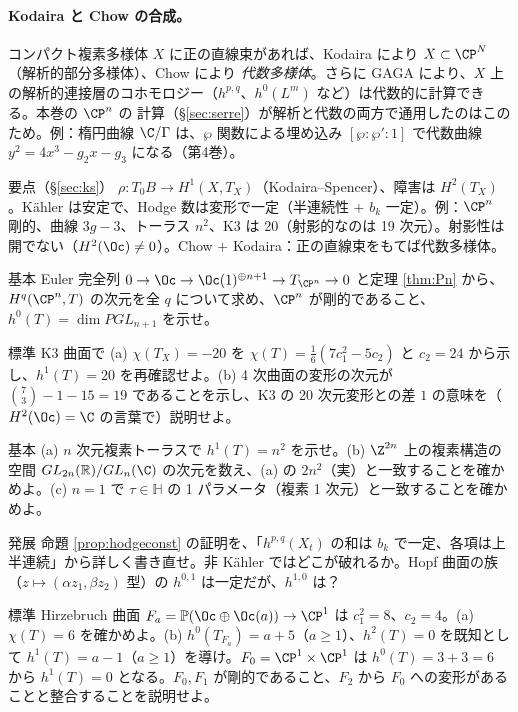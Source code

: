 \paragraph{Kodaira と Chow の合成。}コンパクト複素多様体 $X$ に正の直線束があれば、Kodaira により $X\subset\CP^N$（解析的部分多様体）、Chow により \emph{代数多様体}。さらに GAGA により、$X$ 上の解析的連接層のコホモロジー（$h^{p,q}$、$h^0(L^m)$ など）は代数的に計算できる。本巻の $\CP^n$ の \Cech{} 計算（\S\ref{sec:serre}）が解析と代数の両方で通用したのはこのため。例：楕円曲線 $\C/\Gamma$ は、$\wp$ 関数による埋め込み $[\wp:\wp':1]$ で代数曲線 $y^2=4x^3-g_2x-g_3$ になる（第4巻）。

\begin{keybox}{要点（\S\ref{sec:ks}）}
$\rho:T_0B\to H^1(X,T_X)$（Kodaira--Spencer）、障害は $H^2(T_X)$。Kähler は安定で、Hodge 数は変形で一定（半連続性 $+$ $b_k$ 一定）。例：$\CP^n$ 剛的、曲線 $3g-3$、トーラス $n^2$、K3 は 20（射影的なのは 19 次元）。射影性は開でない（$H^2(\Oc)\ne0$）。Chow $+$ Kodaira：正の直線束をもてば代数多様体。
\end{keybox}

\begin{prob}{基本}\label{p:Pnrigid}
Euler 完全列 $0\to\Oc\to\Oc(1)^{\oplus n+1}\to T_{\CP^n}\to0$ と定理 \ref{thm:Pn} から、$H^q(\CP^n,T)$ の次元を全 $q$ について求め、$\CP^n$ が剛的であること、$h^0(T)=\dim PGL_{n+1}$ を示せ。
\end{prob}
\begin{prob}{標準}\label{p:K3moduli}
K3 曲面で (a) $\chi(T_X)=-20$ を $\chi(T)=\frac16(7c_1^2-5c_2)$ と $c_2=24$ から示し、$h^1(T)=20$ を再確認せよ。(b) 4 次曲面の変形の次元が $\binom73-1-15=19$ であることを示し、K3 の 20 次元変形との差 $1$ の意味を（$H^2(\Oc)=\C$ の言葉で）説明せよ。
\end{prob}
\begin{prob}{基本}\label{p:toriDef}
(a) $n$ 次元複素トーラスで $h^1(T)=n^2$ を示せ。(b) $\Z^{2n}$ 上の複素構造の空間 $GL_{2n}(\mathbb R)/GL_n(\C)$ の次元を数え、(a) の $2n^2$（実）と一致することを確かめよ。(c) $n=1$ で $\tau\in\mathbb H$ の 1 パラメータ（複素 1 次元）と一致することを確かめよ。
\end{prob}
\begin{prob}{発展}\label{p:hodgeconst}
命題 \ref{prop:hodgeconst} の証明を、「$h^{p,q}(X_t)$ の和は $b_k$ で一定、各項は上半連続」から詳しく書き直せ。非 Kähler ではどこが破れるか。Hopf 曲面の族（$z\mapsto(\alpha z_1,\beta z_2)$ 型）の $h^{0,1}$ は一定だが、$h^{1,0}$ は？
\end{prob}
\begin{prob}{標準}\label{p:hirz}
Hirzebruch 曲面 $F_a=\mathbb P(\Oc\oplus\Oc(a))\to\CP^1$ は $c_1^2=8$、$c_2=4$。(a) $\chi(T)=6$ を確かめよ。(b) $h^0(T_{F_a})=a+5$（$a\ge1$）、$h^2(T)=0$ を既知として $h^1(T)=a-1$（$a\ge1$）を導け。$F_0=\CP^1\times\CP^1$ は $h^0(T)=3+3=6$ から $h^1(T)=0$ となる。$F_0,F_1$ が剛的であること、$F_2$ から $F_0$ への変形があることと整合することを説明せよ。
\end{prob}

